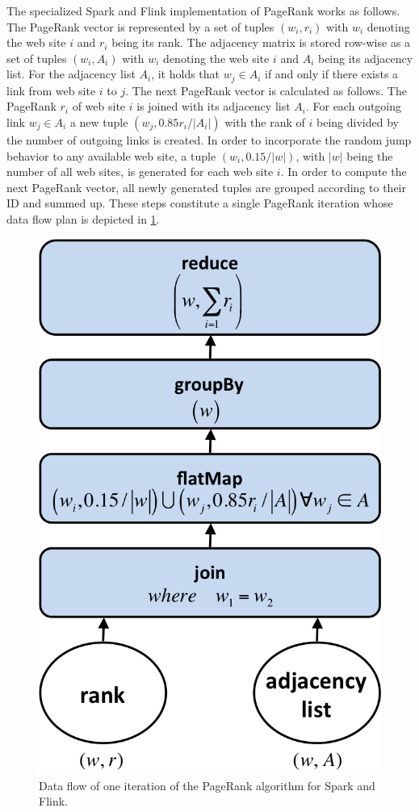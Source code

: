 The specialized Spark and Flink implementation of PageRank works as follows.
The Page\-Rank vector is represented by a set of tuples $(w_i, r_i)$ with $w_i$ denoting the web site $i$ and $r_i$ being its rank.
The adjacency matrix is stored row-wise as a set of tuples $(w_i, A_i)$ with $w_i$ denoting the web site $i$ and $A_i$ being its adjacency list.
For the adjacency list $A_i$, it holds that $w_j \in A_i$ if and only if there exists a link from web site $i$ to $j$.
The next PageRank vector is calculated as follows.
The PageRank $r_i$ of web site $i$ is joined with its adjacency list $A_i$.
For each outgoing link $w_j \in A_i$ a new tuple $(w_j, 0.85r_i/\left|A_i\right|)$ with the rank of $i$ being divided by the number of outgoing links is created.
In order to incorporate the random jump behavior to any available web site, a tuple $(w_i, 0.15/|w|)$, with $|w|$ being the number of all web sites, is generated for each web site $i$.
In order to compute the next PageRank vector, all newly generated tuples are grouped according to their ID and summed up.
These steps constitute a single PageRank iteration whose data flow plan is depicted in \cref{fig:pageRankDataFlow}.
\begin{figure}[htbp]
	\centering
	\includegraphics[width=.275\linewidth]{images/pageRankStep.png}
	\caption{Data flow of one iteration of the PageRank algorithm for Spark and Flink.}
	\label{fig:pageRankDataFlow}
\end{figure}

